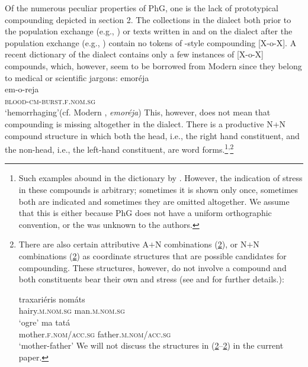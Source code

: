 \documentclass[output=paper]{LSP/langsci}
\begin{document}
Of the numerous peculiar properties of PhG, one is the lack of prototypical  compounding depicted in section 2. The collections in the dialect both prior to the population exchange (e.g., \citealt{Lagarde1886,Levidis1892,Gregoire1909,Dawkins1916}) or texts written in and on the dialect after the population exchange (e.g., \citealt{Theodoridis1960,Theodoridis1964,Theodoridis1966}) contain no tokens of -style compounding [X-o-X]. A recent dictionary of the dialect \citep{Papastefanou2012} contains only a few instances of [X-o-X] compounds, which, however, seem to be borrowed from Modern  since they belong to medical or scientific jargons:
\ea\label{ex:15}
	\glll emoréja\\
			em-o-reja\\
			\textsc{blood-cm-burst.f.nom.sg}\\
	\glt `hemorrhaging'\hfill (cf. Modern , \textit{emoréja})
\z \largerpage[]
This, however, does not mean that compounding is missing altogether in the dialect. There is a  productive N+N compound structure in which both the head, i.e., the right hand constituent, and the non-head, i.e., the left-hand constituent, are word forms.\footnote{Such examples abound in the dictionary by \citet{Papastefanou2012}. However, the indication of stress in these compounds is arbitrary; sometimes it is shown only once, sometimes both are indicated and sometimes they are omitted altogether. We assume that this is either because PhG does not have a uniform orthographic convention, or the  was unknown to the authors.}\textsuperscript{,}\footnote{There are also certain attributive A$+$N combinations (\ref{ex:9i}), or N$+$N combinations (\ref{ex:9ii}) as coordinate structures that are possible candidates for compounding. These structures, however, do not involve a compound  and both constituents bear their own  and stress (see \citealt{Bagriacik} and \citealt{Bagriaciketalforthcoming} for further details.):

\ea\label{ex:9i}
	\gll 	traxariéris nomáts\\
			hairy.\textsc{m.nom.sg} man.\textsc{m.nom.sg}\\
	\glt	`ogre'
\z
\ea\label{ex:9ii}
	\gll	ma tatá\\
			mother.\textsc{f.nom/acc.sg} father.\textsc{m.nom/acc.sg}\\
	\glt	`mother-father'
\z
We will not discuss the structures in (\ref{ex:9i}--\ref{ex:9ii}) in the current paper.
}
\end{document}
